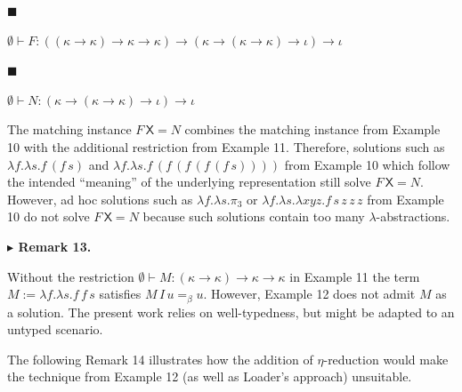 \documentclass[10pt,a4paper]{amsart}
\begin{document}
\par\noindent  $\blacksquare$ 
 
$\emptyset\vdash F:((\kappa\to\kappa)\to\kappa\to\kappa)\to(\kappa\to(\kappa\to%
\kappa)\to\iota)\to\iota$\par
 
 
 
\par\noindent  $\blacksquare$ 
 
$\emptyset\vdash N:(\kappa\to(\kappa\to\kappa)\to\iota)\to\iota$\par
 
 
  
The matching instance $F\,\mathsf{X}=N$ combines the matching instance from Example 10 with the additional restriction from Example 11. Therefore, solutions such as $\lambda f.\lambda s.f\,(f\,s)$ and $\lambda f.\lambda s.f\,(f\,(f\,(f\,(f\,s))))$ from Example 10 which follow the intended “meaning” of the underlying representation still solve $F\,\mathsf{X}=N$. However, ad hoc solutions such as $\lambda f.\lambda s.\pi_{3}$ or $\lambda f.\lambda s.\lambda xyz.f\,s\,z\,z\,z$ from Example 10 do not solve $F\,\mathsf{X}=N$ because such solutions contain too many $\lambda$-abstractions.\par
 
 
 
 
\par\medskip\noindent\textbf{$\blacktriangleright$ Remark 13.}\par
 
 
Without the restriction $\emptyset\vdash M:(\kappa\to\kappa)\to\kappa\to\kappa$ in Example 11 the term $M:=\lambda f.\lambda s.f\,f\,s$ satisfies $M\,I\,u=_{\beta}u$. However, Example 12 does not admit $M$ as a solution. The present work relies on well-typedness, but might be adapted to an untyped scenario.\par
 
 
 
 
The following Remark 14 illustrates how the addition of $\eta$-reduction would make the technique from Example 12 (as well as Loader’s approach) unsuitable.\par
 
\end{document}
